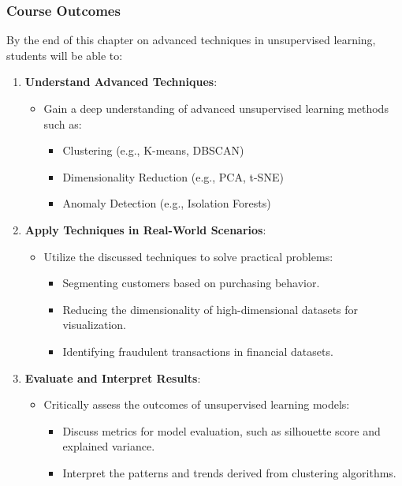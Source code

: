 \documentclass[aspectratio=169]{beamer}
\begin{document}
\begin{frame}[fragile]
    \frametitle{Course Outcomes}
    By the end of this chapter on advanced techniques in unsupervised learning, students will be able to:
    
    \begin{enumerate}
        \item \textbf{Understand Advanced Techniques}:
        \begin{itemize}
            \item Gain a deep understanding of advanced unsupervised learning methods such as:
            \begin{itemize}
                \item Clustering (e.g., K-means, DBSCAN)
                \item Dimensionality Reduction (e.g., PCA, t-SNE)
                \item Anomaly Detection (e.g., Isolation Forests)
            \end{itemize}
        \end{itemize}
        
        \item \textbf{Apply Techniques in Real-World Scenarios}:
        \begin{itemize}
            \item Utilize the discussed techniques to solve practical problems:
            \begin{itemize}
                \item Segmenting customers based on purchasing behavior.
                \item Reducing the dimensionality of high-dimensional datasets for visualization.
                \item Identifying fraudulent transactions in financial datasets.
            \end{itemize}
        \end{itemize}

        \item \textbf{Evaluate and Interpret Results}:
        \begin{itemize}
            \item Critically assess the outcomes of unsupervised learning models:
            \begin{itemize}
                \item Discuss metrics for model evaluation, such as silhouette score and explained variance.
                \item Interpret the patterns and trends derived from clustering algorithms.
            \end{itemize}
        \end{itemize}
        

\end{enumerate}
\end{frame}
\end{document}
